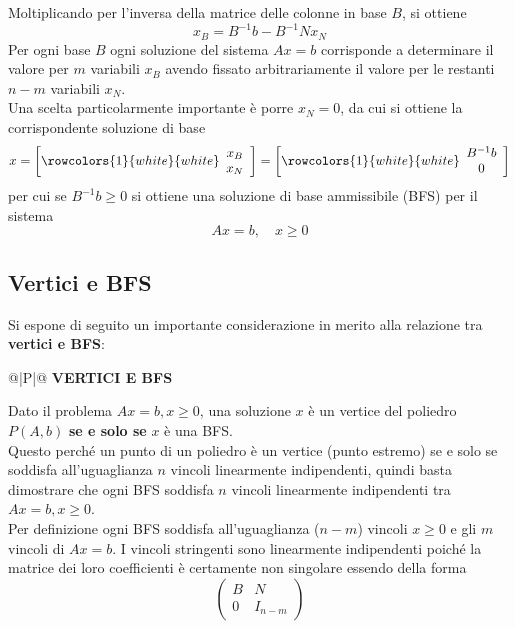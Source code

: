 \documentclass[a4paper]{extarticle}
\renewcommand\arraystretch{}
\begin{document}
Moltiplicando per l'inversa della matrice delle colonne in base $B$, si ottiene
\[\boxed{x_B = B^{-1}b - B^{-1}N x_N}\]
Per ogni base $B$ ogni soluzione del sistema $Ax = b$ corrisponde a determinare il valore per $m$ variabili $x_B$ avendo fissato arbitrariamente il valore per le restanti $n-m$ variabili $x_N$.\\
Una scelta particolarmente importante è porre $x_N=0$, da cui si ottiene la corrispondente soluzione di base
\[x=\left[
    \rowcolors{1}{white}{white}
    \begin{array}{c}
        x_B\\
        x_N
    \end{array}
\right]=\left[
    \rowcolors{1}{white}{white}
    \begin{array}{c}
        B^{-1} b\\
        0
    \end{array}
\right]\]
per cui se $B^{-1}b \geq 0$ si ottiene una soluzione di base ammissibile (BFS) per il sistema
\[Ax = b, \hspace{1em} x \geq 0\]

\vspace{1em}
\subsection{Vertici e BFS}
Si espone di seguito un importante considerazione in merito alla relazione tra \textbf{vertici e BFS}:

\vspace{1em}
\setlength{\tabcolsep}{14pt}
\renewcommand{\arraystretch}{2}
\noindent
\begin{tabularx}{\textwidth}{@{}|P|@{}}
    \hline
    {\textbf{VERTICI E BFS}}\\
    \parbox{\linewidth}{Dato il problema $Ax = b, x \geq 0$, una soluzione $x$ è un vertice del poliedro $P(A, b)$ \textbf{se e solo se} $x$ è una BFS.\\
    Questo perché un punto di un poliedro è un vertice (punto estremo) se e solo se soddisfa all'uguaglianza $n$ vincoli linearmente indipendenti, quindi basta dimostrare che ogni BFS soddisfa $n$ vincoli linearmente indipendenti tra $Ax = b, x \geq 0$.\\
    Per definizione ogni BFS soddisfa all'uguaglianza ($n-m$) vincoli $x \geq 0$ e gli $m$ vincoli di $Ax = b$. I vincoli stringenti sono linearmente indipendenti poiché la matrice dei loro coefficienti è certamente non singolare essendo della forma
    \[\left(
            \begin{array}{cc}
                B & N\\
                0 & I_{n-m}
            \end{array}
    \right)\]
    \vspace{-1mm}}\\
    \hline
\end{tabularx}
\end{document}
